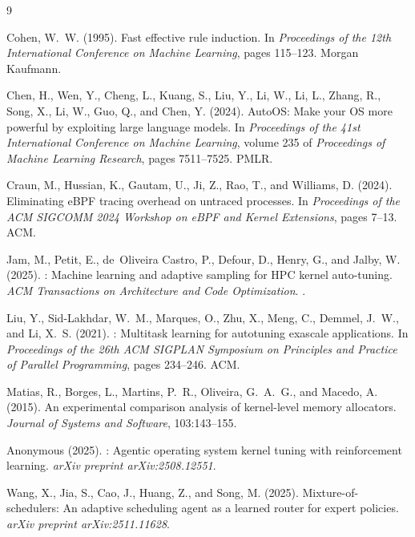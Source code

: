 \documentclass[11pt,a4paper]{article}
\begin{document}
\begin{thebibliography}{9}

Cohen, W.~W. (1995).
\newblock Fast effective rule induction.
\newblock In \emph{Proceedings of the 12th International Conference on Machine Learning}, pages 115--123. Morgan Kaufmann.

Chen, H., Wen, Y., Cheng, L., Kuang, S., Liu, Y., Li, W., Li, L., Zhang, R., Song, X., Li, W., Guo, Q., and Chen, Y. (2024).
\newblock Auto{OS}: Make your {OS} more powerful by exploiting large language models.
\newblock In \emph{Proceedings of the 41st International Conference on Machine Learning}, volume 235 of \emph{Proceedings of Machine Learning Research}, pages 7511--7525. PMLR.

Craun, M., Hussian, K., Gautam, U., Ji, Z., Rao, T., and Williams, D. (2024).
\newblock Eliminating {eBPF} tracing overhead on untraced processes.
\newblock In \emph{Proceedings of the ACM SIGCOMM 2024 Workshop on eBPF and Kernel Extensions}, pages 7--13. ACM.

Jam, M., Petit, E., de~Oliveira Castro, P., Defour, D., Henry, G., and Jalby, W. (2025).
: Machine learning and adaptive sampling for {HPC} kernel auto-tuning.
\newblock \emph{ACM Transactions on Architecture and Code Optimization}.
\newblock {}.

Liu, Y., Sid-Lakhdar, W.~M., Marques, O., Zhu, X., Meng, C., Demmel, J.~W., and Li, X.~S. (2021).
: Multitask learning for autotuning exascale applications.
\newblock In \emph{Proceedings of the 26th ACM SIGPLAN Symposium on Principles and Practice of Parallel Programming}, pages 234--246. ACM.

Matias, R., Borges, L., Martins, P.~R., Oliveira, G.~A.~G., and Macedo, A. (2015).
\newblock An experimental comparison analysis of kernel-level memory allocators.
\newblock \emph{Journal of Systems and Software}, 103:143--155.

Anonymous (2025).
: Agentic operating system kernel tuning with reinforcement learning.
\newblock \emph{arXiv preprint arXiv:2508.12551}.

Wang, X., Jia, S., Cao, J., Huang, Z., and Song, M. (2025).
\newblock Mixture-of-schedulers: An adaptive scheduling agent as a learned router for expert policies.
\newblock \emph{arXiv preprint arXiv:2511.11628}.

\end{thebibliography}
\end{document}
